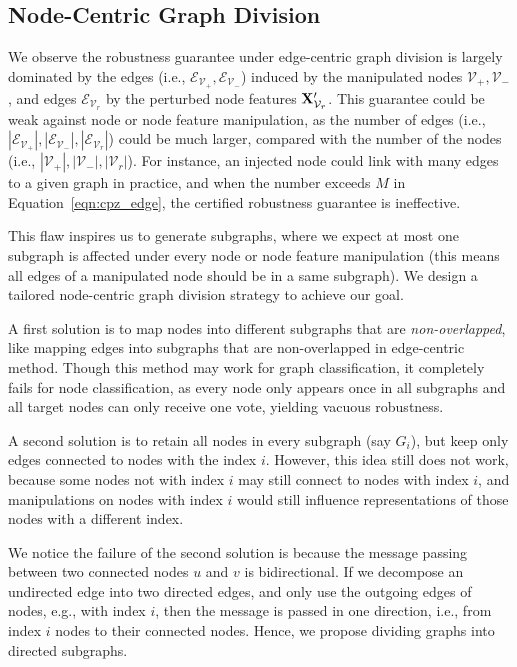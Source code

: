 \subsection{Node-Centric Graph Division}
\label{Sec:nodebased}


We observe the robustness guarantee under edge-centric graph division is largely dominated by the  
edges (i.e., $\mathcal{E}_{\mathcal{V}_+}, \mathcal{E}_{\mathcal{V}_-}$) induced by the manipulated nodes $\mathcal{V}_+, \mathcal{V}_-$, and edges $\mathcal{E}_{\mathcal{V}_r}$ by the perturbed node features ${\bf X}'_{\mathcal{V}_r}$. 
This guarantee could be weak against node or node feature manipulation, 
as the number of edges (i.e., $|\mathcal{E}_{\mathcal{V}_+}|, |\mathcal{E}_{\mathcal{V}_-}|, |\mathcal{E}_{\mathcal{V}_r}|$) could be much larger, compared with the number of the nodes (i.e., $|{\mathcal{V}_+}|, |{\mathcal{V}_-}|, |{\mathcal{V}_r}|$). 
For instance, an injected node could link with many edges to a given graph in practice, and when the number exceeds $M$ in Equation~\ref{eqn:cpz_edge},  the certified robustness guarantee is ineffective. 

This flaw inspires us to generate subgraphs, where we expect at most one subgraph is affected 
under every node or node feature manipulation (this means all edges of a manipulated node should be in a same subgraph). 
We design a tailored {node-centric graph division} strategy to achieve our goal. 



A first solution is to map nodes into different subgraphs that are \emph{non-overlapped}, like mapping edges into subgraphs that are non-overlapped in edge-centric method.  
Though this method may work for graph classification, 
 it completely fails for node classification, as every node only appears once in all subgraphs and all target nodes can only receive one vote, yielding vacuous robustness. 

A second solution is to 
retain all nodes in every subgraph (say $G_i$), but keep only edges connected to nodes with the index $i$.  However, this idea still does not work, because some nodes not with index $i$ may still connect to nodes with index $i$, and manipulations on nodes with index $i$ would still influence representations of those nodes with a different index. 

We notice the failure of the second solution is because the message passing between two connected nodes $u$ and $v$ is bidirectional. 
If we decompose an undirected edge into two directed edges, and only use the outgoing edges of nodes, e.g., with index $i$, then the message 
is passed in one direction, i.e., from index $i$ nodes to their connected nodes. 
Hence, we propose dividing graphs into directed subgraphs.


